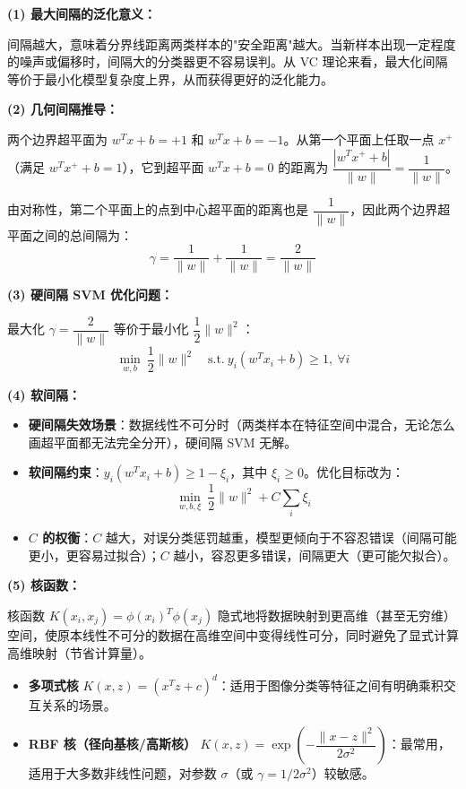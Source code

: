 \documentclass[a4paper,11pt]{ctexart}
\begin{document}
\begin{solutionbox}[参考答案与详细解析]
    \textbf{(1) 最大间隔的泛化意义：}

    间隔越大，意味着分界线距离两类样本的"安全距离"越大。当新样本出现一定程度的噪声或偏移时，间隔大的分类器更不容易误判。从 VC 理论来看，最大化间隔等价于最小化模型复杂度上界，从而获得更好的泛化能力。

    \textbf{(2) 几何间隔推导：}

    两个边界超平面为 $w^T x + b = +1$ 和 $w^T x + b = -1$。从第一个平面上任取一点 $x^+$（满足 $w^T x^+ + b = 1$），它到超平面 $w^T x + b = 0$ 的距离为 $\dfrac{|w^T x^+ + b|}{\|w\|} = \dfrac{1}{\|w\|}$。

    由对称性，第二个平面上的点到中心超平面的距离也是 $\dfrac{1}{\|w\|}$，因此两个边界超平面之间的总间隔为：
    \[
    \gamma = \frac{1}{\|w\|} + \frac{1}{\|w\|} = \frac{2}{\|w\|}
    \]

    \textbf{(3) 硬间隔 SVM 优化问题：}

    最大化 $\gamma = \dfrac{2}{\|w\|}$ 等价于最小化 $\dfrac{1}{2}\|w\|^2$：
    \[
    \min_{w, b}\ \frac{1}{2}\|w\|^2 \quad \text{s.t.}\ y_i(w^T x_i + b) \geq 1,\ \forall i
    \]

    \textbf{(4) 软间隔：}

    \begin{itemize}
        \item \textbf{硬间隔失效场景}：数据线性不可分时（两类样本在特征空间中混合，无论怎么画超平面都无法完全分开），硬间隔 SVM 无解。
        \item \textbf{软间隔约束}：$y_i(w^T x_i + b) \geq 1 - \xi_i$，其中 $\xi_i \geq 0$。优化目标改为：
        \[
        \min_{w, b, \xi}\ \frac{1}{2}\|w\|^2 + C\sum_i \xi_i
        \]
        \item \textbf{$C$ 的权衡}：$C$ 越大，对误分类惩罚越重，模型更倾向于不容忍错误（间隔可能更小，更容易过拟合）；$C$ 越小，容忍更多错误，间隔更大（更可能欠拟合）。
    \end{itemize}

    \textbf{(5) 核函数：}

    核函数 $K(x_i, x_j) = \phi(x_i)^T \phi(x_j)$ 隐式地将数据映射到更高维（甚至无穷维）空间，使原本线性不可分的数据在高维空间中变得线性可分，同时避免了显式计算高维映射（节省计算量）。

    \begin{keybox}[常见核函数]
        \begin{itemize}
            \item \textbf{多项式核} $K(x,z) = (x^T z + c)^d$：适用于图像分类等特征之间有明确乘积交互关系的场景。
            \item \textbf{RBF 核（径向基核/高斯核）} $K(x,z) = \exp\left(-\dfrac{\|x-z\|^2}{2\sigma^2}\right)$：最常用，适用于大多数非线性问题，对参数 $\sigma$（或 $\gamma = 1/2\sigma^2$）较敏感。
        \end{itemize}
    \end{keybox}
\end{solutionbox}
\end{document}
